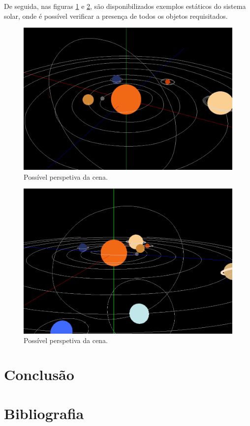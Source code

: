 \documentclass[a4paper]{article}
\begin{document}
De seguida, nas figuras \ref{img:scene_1} e \ref{img:scene_2}, são disponibilizados exemplos estáticos do sistema solar, onde é possível verificar a presença de todos os objetos requisitados.

\begin{figure}[H]
\centering
\includegraphics[scale=0.26]{scene_1.png}
\caption{Possível perspetiva da cena.}
\label{img:scene_1}
\end{figure}

\begin{figure}[H]
\centering
\includegraphics[scale=0.28]{scene_2.png}
\caption{Possível perspetiva da cena.}
\label{img:scene_2}
\end{figure}


\section{Conclusão}
\label{sec:conclusao}


\section{Bibliografia}
\label{sec:bibliografia}
\end{document}
